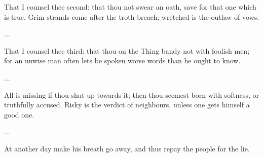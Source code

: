 \bvb That I counsel thee second: that thou not swear an oath, save for that one which is true. Grim strands come after the troth-breach; wretched is the outlaw of vows.\evb
\evg


\bvg
\bva ...\eva

\bvb That I counsel thee third: that thou on the Thing bandy not with foolish men; for an unwise man often lets be spoken worse words than he ought to know.\evb
\evg


\bvg
\bva ...\eva

\bvb All is missing if thou shut up towards it; then thou seemest born with softness, or truthfully accused. Risky is the verdict of neighbours, unless one gets himself a good one.\evb
\evg


\bvg
\bva ...\eva

\bvb At another day make his breath go away, and thus repay the people for the lie.\evb
\evg
